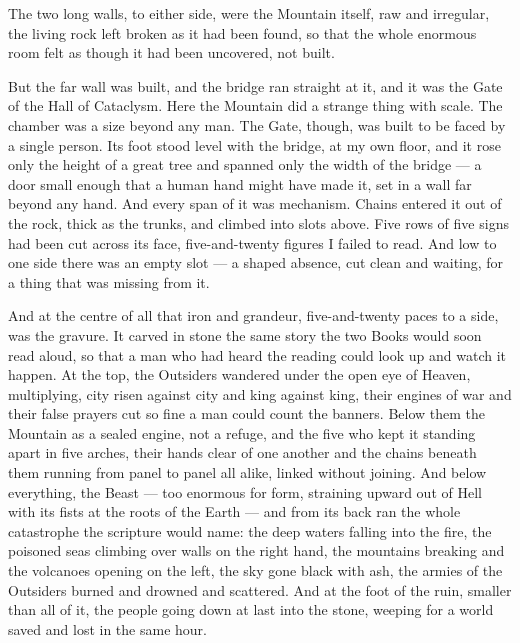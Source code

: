 The two long walls, to either side, were the Mountain itself, raw and irregular, the living rock left broken as it had been found, so that the whole enormous room felt as though it had been uncovered, not built.\par

But the far wall was built, and the bridge ran straight at it, and it was the Gate of the Hall of Cataclysm. Here the Mountain did a strange thing with scale. The chamber was a size beyond any man. The Gate, though, was built to be faced by a single person. Its foot stood level with the bridge, at my own floor, and it rose only the height of a great tree and spanned only the width of the bridge --- a door small enough that a human hand might have made it, set in a wall far beyond any hand. And every span of it was mechanism. Chains entered it out of the rock, thick as the trunks, and climbed into slots above. Five rows of five signs had been cut across its face, five-and-twenty figures I failed to read. And low to one side there was an empty slot --- a shaped absence, cut clean and waiting, for a thing that was missing from it.\par

And at the centre of all that iron and grandeur, five-and-twenty paces to a side, was the gravure. It carved in stone the same story the two Books would soon read aloud, so that a man who had heard the reading could look up and watch it happen. At the top, the Outsiders wandered under the open eye of Heaven, multiplying, city risen against city and king against king, their engines of war and their false prayers cut so fine a man could count the banners. Below them the Mountain as a sealed engine, not a refuge, and the five who kept it standing apart in five arches, their hands clear of one another and the chains beneath them running from panel to panel all alike, linked without joining. And below everything, the Beast --- too enormous for form, straining upward out of Hell with its fists at the roots of the Earth --- and from its back ran the whole catastrophe the scripture would name: the deep waters falling into the fire, the poisoned seas climbing over walls on the right hand, the mountains breaking and the volcanoes opening on the left, the sky gone black with ash, the armies of the Outsiders burned and drowned and scattered. And at the foot of the ruin, smaller than all of it, the people going down at last into the stone, weeping for a world saved and lost in the same hour.\par

